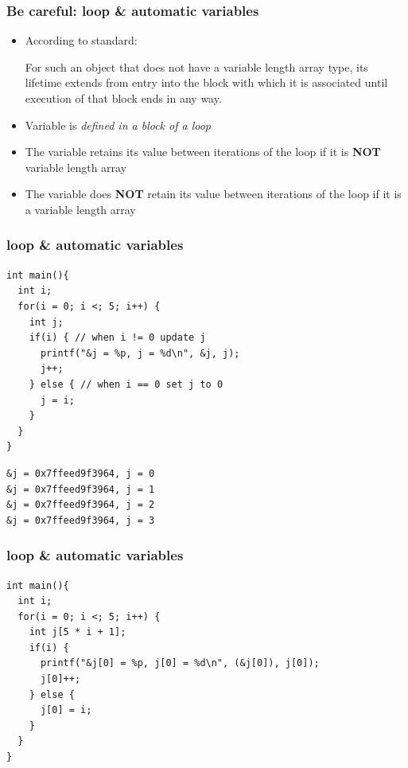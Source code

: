 \documentclass{../c-lecture}
\begin{document}
\begin{frame}
  \frametitle{Be careful: loop \& automatic variables}
  \begin{itemize}
    \item According to standard:
    \begin{block}{}
      For such an object that does not have a variable length array type, its
      lifetime extends from entry into the block with which it is associated
      until execution of that block ends in any way.
    \end{block}
    \item Variable is \textit{\color{Yellow} defined in a block of a loop}
    \item
      The variable retains its value between iterations of the loop if it is
      \textbf{\color{RubineRed} NOT} variable length array
    \item
      The variable does \textbf{\color{RubineRed} NOT} retain its value between
      iterations of the loop if it is a variable length array
  \end{itemize}
\end{frame}

\begin{frame}[fragile]
  \frametitle{loop \& automatic variables}
  \begin{verbatim}
int main(){
  int i;
  for(i = 0; i <; 5; i++) {
    int j;
    if(i) { // when i != 0 update j
      printf("&j = %p, j = %d\n", &j, j);
      j++;
    } else { // when i == 0 set j to 0
      j = i;
    }
  }
}
  \end{verbatim}
\end{frame}

\begin{frame}[fragile]
  \begin{verbatim}
&j = 0x7ffeed9f3964, j = 0
&j = 0x7ffeed9f3964, j = 1
&j = 0x7ffeed9f3964, j = 2
&j = 0x7ffeed9f3964, j = 3
  \end{verbatim}
\end{frame}

\begin{frame}[fragile]
  \frametitle{loop \& automatic variables}
  \begin{verbatim}
int main(){
  int i;
  for(i = 0; i <; 5; i++) {
    int j[5 * i + 1];
    if(i) {
      printf("&j[0] = %p, j[0] = %d\n", (&j[0]), j[0]);
      j[0]++;
    } else {
      j[0] = i;
    }
  }
}
  \end{verbatim}
\end{frame}
\end{document}
